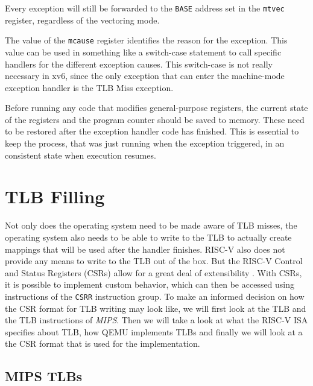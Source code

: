 Every exception will still be forwarded to the \texttt{BASE} address set in the \texttt{mtvec}
register, regardless of the vectoring mode.

The value of the \texttt{mcause} register identifies the reason for the exception.
This value can be used in something like a switch-case statement to call specific handlers
for the different exception causes.
This switch-case is not really necessary in xv6, since the only exception that can enter
the machine-mode exception handler is the TLB Miss exception.

Before running any code that modifies general-purpose registers, the current state of the
registers and the program counter should be saved to memory. These need to be restored after
the exception handler code has finished.
This is essential to keep the process, that was just running when the exception triggered,
in an consistent state when execution resumes.


\section{TLB Filling}
Not only does the operating system need to be made aware of TLB misses,
the operating system also needs to be able to write to the TLB to actually create
mappings that will be used after the handler finishes.
RISC-V also does not provide any means to write to the TLB out of the box. But the RISC-V Control and Status Registers
(CSRs) allow for a great deal of extensibility \cite{riscvreader}.
With CSRs, it is possible to implement custom behavior, which can then be accessed using instructions
of the \texttt{CSRR} instruction group.
To make an informed decision on how the CSR format for TLB writing may look like, we will first
look at the TLB and the TLB instructions of \emph{MIPS}. Then we will take a look at what the
RISC-V ISA specifies about TLB, how QEMU implements TLBs and finally we will look at a the
CSR format that is used for the implementation.

\subsection{MIPS TLBs}               %

